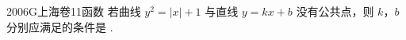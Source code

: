 
\begin{problem}{2006}{G}{上海卷}{11}{函数}
若曲线 $ y^2 = |x| + 1 $ 与直线 $ y = kx + b $ 没有公共点，则 $ k $，$ b $ 分别应满足的条件是 \underline{\hspace{4em}}.
\end{problem}

\begin{answer}

\end{answer}

\begin{solutions}

\end{solutions}